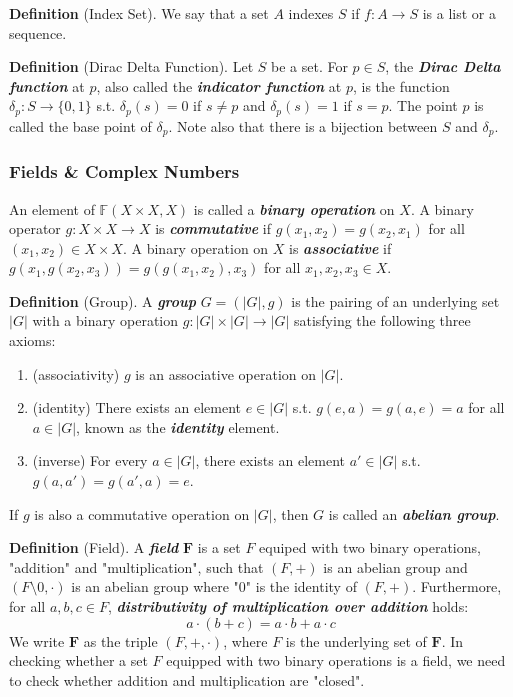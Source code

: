 \textbf{Definition} (Index Set). We say that a set $A$ indexes $S$ if $f:A\to S$ is a list or a sequence.

\textbf{Definition} (Dirac Delta Function). Let $S$ be a set. For $p\in S$, the \textbf{\textit{Dirac Delta function}} at $p$, also called the \textbf{\textit{indicator function}} at $p$, is the function $\delta_p:S\to \{0,1\}$ s.t. $\delta_p(s)=0$ if $s\neq p$ and $\delta_p(s)=1$ if $s=p$. The point $p$ is called the base point of $\delta_p$. Note also that there is a bijection between $S$ and $\delta_p$.

\subsubsection{Fields \& Complex Numbers}
An element of $\mathbb{F}(X\times X, X)$ is called a \textbf{\textit{binary operation}} on $X$. A binary operator $g:X\times X\to X$ is \textbf{\textit{commutative}} if $g(x_1, x_2)=g(x_2, x_1)$ for all $(x_1,x_2)\in X\times X$. A binary operation on $X$ is \textbf{\textit{associative}} if $g(x_1,g(x_2, x_3))=g(g(x_1,x_2),x_3)$ for all $x_1, x_2, x_3\in X$.

\textbf{Definition} (Group). A \textbf{\textit{group}} $G=(|G|,g)$ is the pairing of an underlying set $|G|$ with a binary operation $g:|G|\times|G|\to|G|$ satisfying the following three axioms:
\begin{enumerate}
    \item (associativity) $g$ is an associative operation on $|G|$.
    \item (identity) There exists an element $e\in|G|$ s.t. $g(e,a)=g(a,e)=a$ for all $a\in|G|$, known as the \textbf{\textit{identity}} element.
    \item (inverse) For every $a\in|G|$, there exists an element $a'\in|G|$ s.t. $g(a,a')=g(a',a)=e$.
\end{enumerate}
If $g$ is also a commutative operation on $|G|$, then $G$ is called an \textbf{\textit{abelian group}}.

\textbf{Definition} (Field). A \textbf{\textit{field}} $\mathbf{F}$ is a set $F$ equiped with two binary operations, "addition" and "multiplication", such that $(F,+)$ is an abelian group and $(F\setminus 0,\cdot)$ is an abelian group where "0" is the identity of $(F,+)$. Furthermore, for all $a, b, c\in F$, \textbf{\textit{distributivity of multiplication over addition}} holds:
\[
a\cdot(b+c)=a\cdot b + a\cdot c
\]
We write $\mathbf{F}$ as the triple $(F,+,\cdot)$, where $F$ is the underlying set of $\mathbf{F}$. In checking whether a set $F$ equipped with two binary operations is a field, we need to check whether addition and multiplication are "closed".

